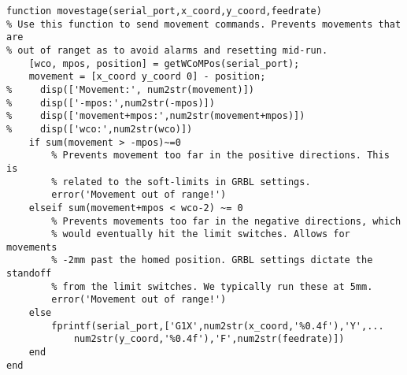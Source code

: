 \begin{lstlisting}
function movestage(serial_port,x_coord,y_coord,feedrate)
% Use this function to send movement commands. Prevents movements that are
% out of ranget as to avoid alarms and resetting mid-run.
    [wco, mpos, position] = getWCoMPos(serial_port);
    movement = [x_coord y_coord 0] - position;
%     disp(['Movement:', num2str(movement)])
%     disp(['-mpos:',num2str(-mpos)])
%     disp(['movement+mpos:',num2str(movement+mpos)])
%     disp(['wco:',num2str(wco)])
    if sum(movement > -mpos)~=0
        % Prevents movement too far in the positive directions. This is
        % related to the soft-limits in GRBL settings.
        error('Movement out of range!')
    elseif sum(movement+mpos < wco-2) ~= 0
        % Prevents movements too far in the negative directions, which
        % would eventually hit the limit switches. Allows for movements
        % -2mm past the homed position. GRBL settings dictate the standoff
        % from the limit switches. We typically run these at 5mm.
        error('Movement out of range!')
    else
        fprintf(serial_port,['G1X',num2str(x_coord,'%0.4f'),'Y',...
            num2str(y_coord,'%0.4f'),'F',num2str(feedrate)])
    end
end


\end{lstlisting}